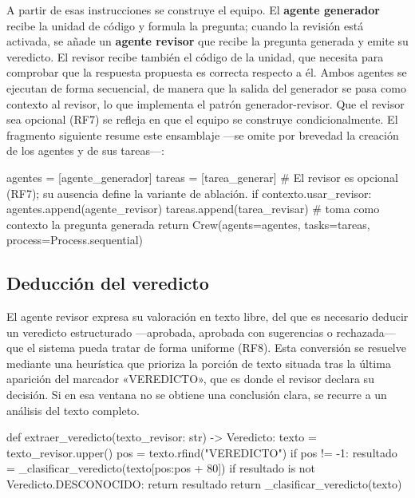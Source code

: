 A partir de esas instrucciones se construye el equipo. El \textbf{agente
generador} recibe la unidad de código y formula la pregunta; cuando la
revisión está activada, se añade un \textbf{agente revisor} que recibe la
pregunta generada y emite su veredicto. El revisor recibe también el
código de la unidad, que necesita para comprobar que la respuesta propuesta
es correcta respecto a él. Ambos agentes se ejecutan de forma
secuencial, de manera que la salida del generador se pasa como contexto al
revisor, lo que implementa el patrón generador-revisor. Que el revisor sea
opcional (RF7) se refleja en que el equipo se construye condicionalmente.
El fragmento siguiente resume este ensamblaje ---se omite por
brevedad la creación de los agentes y de sus tareas---:

\begin{pythoncode}[title={agentes.py --- equipo generador-revisor}, list entry={\protect\numberline{\thelisting}Equipo generador-revisor}]
agentes = [agente_generador]
tareas = [tarea_generar]
# El revisor es opcional (RF7); su ausencia define la variante de ablación.
if contexto.usar_revisor:
    agentes.append(agente_revisor)
    tareas.append(tarea_revisar)   # toma como contexto la pregunta generada
return Crew(agents=agentes, tasks=tareas, process=Process.sequential)
\end{pythoncode}

\subsection{Deducción del veredicto}
\label{sec:impl-veredicto}

El agente revisor expresa su valoración en texto libre, del que es
necesario deducir un veredicto estructurado ---aprobada, aprobada con
sugerencias o rechazada--- que el sistema pueda tratar de forma uniforme
(RF8). Esta conversión se resuelve mediante una heurística que prioriza la
porción de texto situada tras la última aparición del marcador
«VEREDICTO», que es donde el revisor declara su decisión. Si en esa
ventana no se obtiene una conclusión clara, se recurre a un análisis del
texto completo.

\begin{pythoncode}[title={agentes.py --- deducción del veredicto del revisor}, list entry={\protect\numberline{\thelisting}Deducción del veredicto del revisor}]
def extraer_veredicto(texto_revisor: str) -> Veredicto:
    texto = texto_revisor.upper()
    pos = texto.rfind("VEREDICTO")
    if pos != -1:
        resultado = _clasificar_veredicto(texto[pos:pos + 80])
        if resultado is not Veredicto.DESCONOCIDO:
            return resultado
    return _clasificar_veredicto(texto)
\end{pythoncode}

